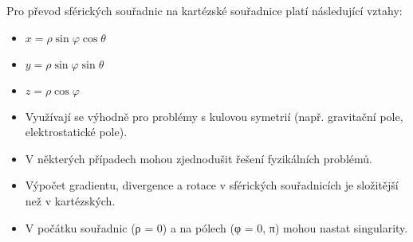 \documentclass[letterpaper,10pt,english]{jupyterBook}
\begin{document}
\sphinxAtStartPar
{}

\sphinxAtStartPar
Pro převod sférických souřadnic na kartézské souřadnice platí následující vztahy:
\begin{itemize}
\item {} 
\sphinxAtStartPar
\(x = \rho \sin{\varphi} \cos{\theta}\)

\item {} 
\sphinxAtStartPar
\(y = \rho \sin{\varphi} \sin{\theta}\)

\item {} 
\sphinxAtStartPar
\(z = \rho \cos{\varphi}\)

\end{itemize}

\sphinxAtStartPar
{}
\begin{itemize}
\item {} 
\sphinxAtStartPar
{} Využívají se výhodně pro problémy s kulovou symetrií (např. gravitační pole, elektrostatické pole).

\item {} 
\sphinxAtStartPar
{} V některých případech mohou zjednodušit řešení fyzikálních problémů.

\end{itemize}

\sphinxAtStartPar
{}
\begin{itemize}
\item {} 
\sphinxAtStartPar
{} Výpočet gradientu, divergence a rotace v sférických souřadnicích je složitější než v kartézských.

\item {} 
\sphinxAtStartPar
{} V počátku souřadnic (ρ = 0) a na pólech (φ = 0, π) mohou nastat singularity.

\end{itemize}
\end{document}
